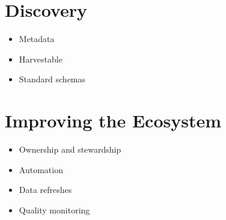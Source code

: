 \documentclass[
  openany]{book}
\providecommand{\tightlist}{%
  \setlength{\itemsep}{0pt}\setlength{\parskip}{0pt}}
\begin{document}
\hypertarget{discovery}{%
\section{Discovery}\label{discovery}}

\begin{itemize}
\tightlist
\item
  Metadata
\item
  Harvestable
\item
  Standard schemas
\end{itemize}

\hypertarget{improving-the-ecosystem}{%
\section{Improving the Ecosystem}\label{improving-the-ecosystem}}

\begin{itemize}
\tightlist
\item
  Ownership and stewardship
\item
  Automation
\item
  Data refreshes
\item
  Quality monitoring
\end{itemize}

  
\end{document}
